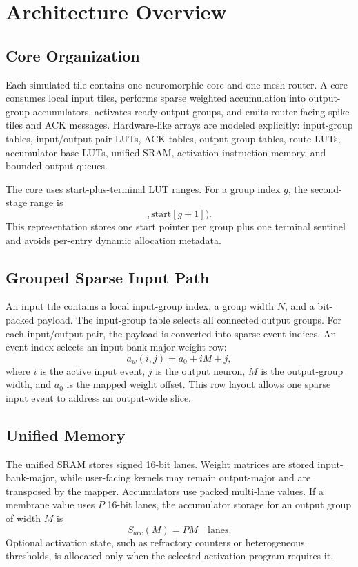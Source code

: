 \documentclass[10pt,conference]{IEEEtran}
\begin{document}
\section{Architecture Overview}
\subsection{Core Organization}
Each simulated tile contains one neuromorphic core and one mesh router. A core consumes local input tiles, performs sparse weighted accumulation into output-group accumulators, activates ready output groups, and emits router-facing spike tiles and ACK messages. Hardware-like arrays are modeled explicitly: input-group tables, input/output pair LUTs, ACK tables, output-group tables, route LUTs, accumulator base LUTs, unified SRAM, activation instruction memory, and bounded output queues.

The core uses start-plus-terminal LUT ranges. For a group index $g$, the second-stage range is
\begin{equation}
    [s_g, e_g) = [\mathrm{start}[g], \mathrm{start}[g+1]).
\end{equation}
This representation stores one start pointer per group plus one terminal sentinel and avoids per-entry dynamic allocation metadata.

\subsection{Grouped Sparse Input Path}
An input tile contains a local input-group index, a group width $N$, and a bit-packed payload. The input-group table selects all connected output groups. For each input/output pair, the payload is converted into sparse event indices. An event index selects an input-bank-major weight row:
\begin{equation}
    a_w(i,j) = a_0 + iM + j,
\end{equation}
where $i$ is the active input event, $j$ is the output neuron, $M$ is the output-group width, and $a_0$ is the mapped weight offset. This row layout allows one sparse input event to address an output-wide slice.

\subsection{Unified Memory}
The unified SRAM stores signed 16-bit lanes. Weight matrices are stored input-bank-major, while user-facing kernels may remain output-major and are transposed by the mapper. Accumulators use packed multi-lane values. If a membrane value uses $P$ 16-bit lanes, the accumulator storage for an output group of width $M$ is
\begin{equation}
    S_{acc}(M) = PM \quad \text{lanes}.
\end{equation}
Optional activation state, such as refractory counters or heterogeneous thresholds, is allocated only when the selected activation program requires it.
\end{document}
